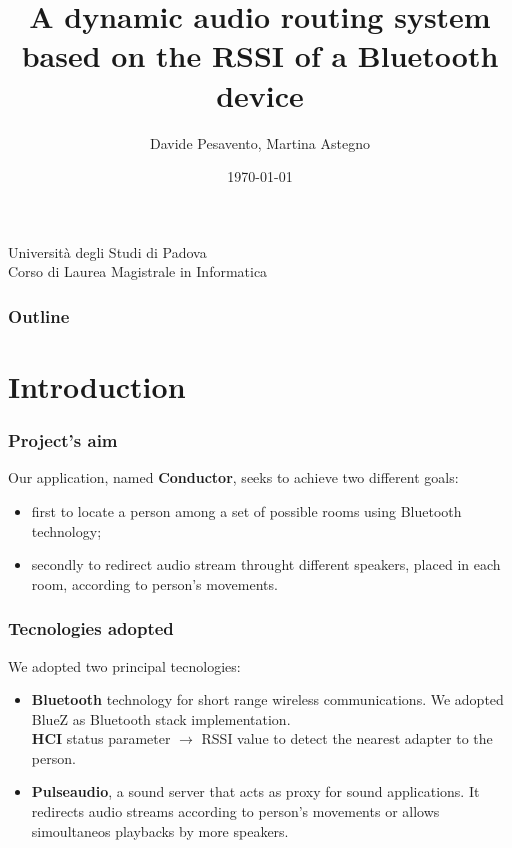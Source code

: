 \documentclass{beamer}
\title{A dynamic audio routing system\\based on the RSSI of a Bluetooth device}
\author{Davide Pesavento, Martina Astegno}
\date{\today}
\begin{document}
\begin{frame}[plain]
\titlepage
	\begin{center}
		Universit\`{a} degli Studi di Padova \\
		Corso di Laurea Magistrale in Informatica
	\end{center}
\end{frame} 
 
\begin{frame}
	\frametitle{Outline}
	\tableofcontents 
\end{frame}


\section{Introduction}

	\begin{frame}
		\frametitle{Project's aim}
		Our application, named \textbf{Conductor}, seeks to achieve two different goals: 
		\pause
		\begin{itemize}
		\item first to locate a person among a set of possible rooms using Bluetooth technology;
		\pause
		\item secondly to redirect audio stream throught different speakers, placed in each room, according to person's movements. 
		\end{itemize}    
	\end{frame}
	
	\begin{frame}
		\frametitle{Tecnologies adopted}
		We adopted two principal tecnologies:
		\pause
		\begin{itemize}
		\item \textbf{Bluetooth} technology for short range wireless communications. We adopted BlueZ as Bluetooth stack implementation.\\ \textbf{HCI} status parameter $\rightarrow$ RSSI value to detect the nearest adapter to the person. 
		\pause
		\item \textbf{Pulseaudio}, a sound server that acts as proxy for sound applications. It redirects audio streams according to person's movements or allows simoultaneos playbacks by more speakers. 
		
		\end{itemize}
	\end{frame}
	
\end{document}
